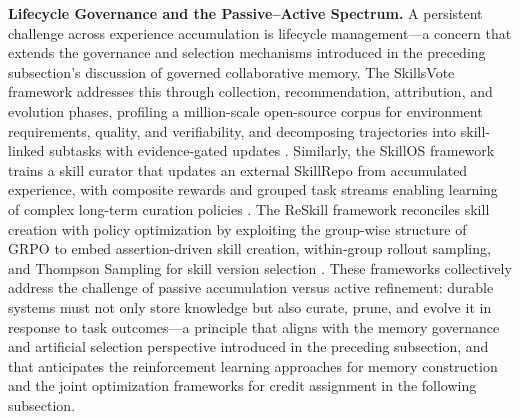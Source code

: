 \documentclass[11pt]{article}
\begin{document}
\textbf{Lifecycle Governance and the Passive--Active Spectrum.} A persistent challenge across experience accumulation is lifecycle management---a concern that extends the governance and selection mechanisms introduced in the preceding subsection's discussion of governed collaborative memory. The SkillsVote framework addresses this through collection, recommendation, attribution, and evolution phases, profiling a million-scale open-source corpus for environment requirements, quality, and verifiability, and decomposing trajectories into skill-linked subtasks with evidence-gated updates \cite{ref144}. Similarly, the SkillOS framework trains a skill curator that updates an external SkillRepo from accumulated experience, with composite rewards and grouped task streams enabling learning of complex long-term curation policies \cite{ref145}. The ReSkill framework reconciles skill creation with policy optimization by exploiting the group-wise structure of GRPO to embed assertion-driven skill creation, within-group rollout sampling, and Thompson Sampling for skill version selection \cite{ref146}. These frameworks collectively address the challenge of passive accumulation versus active refinement: durable systems must not only store knowledge but also curate, prune, and evolve it in response to task outcomes---a principle that aligns with the memory governance and artificial selection perspective introduced in the preceding subsection, and that anticipates the reinforcement learning approaches for memory construction and the joint optimization frameworks for credit assignment in the following subsection.
\end{document}

